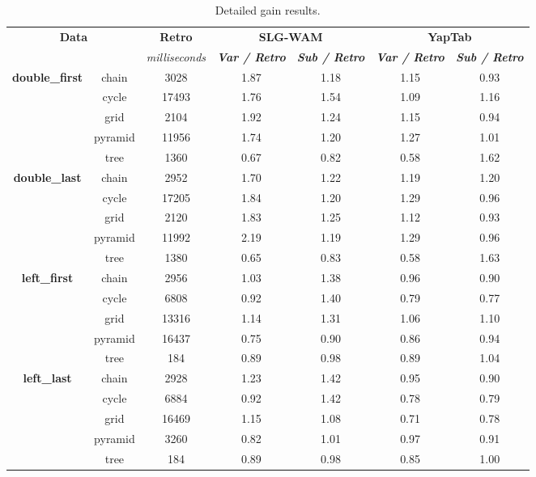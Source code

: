 \begin{table}[ht]
\centering
\footnotesize{
  \begin{tabular}{cc|c|cc|cc}
   \hline
    \hline
    \multicolumn{2}{c|}{\multirow{2}{*}{\small{\textbf{Data}}}} & \textbf{\small{Retro}} & \multicolumn{2}{c|}{\small{\textbf{SLG-WAM}}} & \multicolumn{2}{c}{\small{\textbf{YapTab}}} \\
     \multicolumn{2}{c|}{} & \scriptsize{\textit{milliseconds}} & \textbf{\textit{\scriptsize{Var / Retro}}} & \textbf{\textit{\scriptsize{Sub / Retro}}} & \textbf{\textit{\scriptsize{Var / Retro}}} & \textbf{\textit{\scriptsize{Sub / Retro}}} \\
   \hline
   \hline

\multirow{5}{*}{\textbf{double\_first}} &  chain &  3028 &  1.87  &  1.18  &  1.15 & 0.93 \\
&  cycle &  17493 &  1.76  &  1.54  &  1.09 & 1.16 \\
&  grid &  2104 &  1.92  &  1.24  &  1.15 & 0.94 \\
&  pyramid &  11956 &  1.74  &  1.20  &  1.27 & 1.01 \\
&  tree &  1360 &  0.67  &  0.82  &  0.58 & 1.62 \\
\hline
\multirow{5}{*}{\textbf{double\_last}} &  chain &  2952 &  1.70  &  1.22  &  1.19 & 1.20 \\
&  cycle &  17205 &  1.84  &  1.20  &  1.29 & 0.96 \\
&  grid &  2120 &  1.83  &  1.25  &  1.12 & 0.93 \\
&  pyramid &  11992 &  2.19  &  1.19  &  1.29 & 0.96 \\
&  tree &  1380 &  0.65  &  0.83  &  0.58 & 1.63 \\
\hline
\multirow{5}{*}{\textbf{left\_first}} &  chain &  2956 &  1.03  &  1.38  &  0.96 & 0.90 \\
&  cycle &  6808 &  0.92  &  1.40  &  0.79 & 0.77 \\
&  grid &  13316 &  1.14  &  1.31  &  1.06 & 1.10 \\
&  pyramid &  16437 &  0.75  &  0.90  &  0.86 & 0.94 \\
&  tree &  184 &  0.89  &  0.98  &  0.89 & 1.04 \\
\hline
\multirow{5}{*}{\textbf{left\_last}} &  chain &  2928 &  1.23  &  1.42  &  0.95 & 0.90 \\
&  cycle &  6884 &  0.92  &  1.42  &  0.78 & 0.79 \\
&  grid &  16469 &  1.15  &  1.08  &  0.71 & 0.78 \\
&  pyramid &  3260 &  0.82  &  1.01  &  0.97 & 0.91 \\
&  tree &  184 &  0.89  &  0.98  &  0.85 & 1.00 \\
\hline
\hline
\end{tabular}
}
\caption{Detailed gain results.}
\label{tbl:results_detail_gain_tst}
\end{table}
